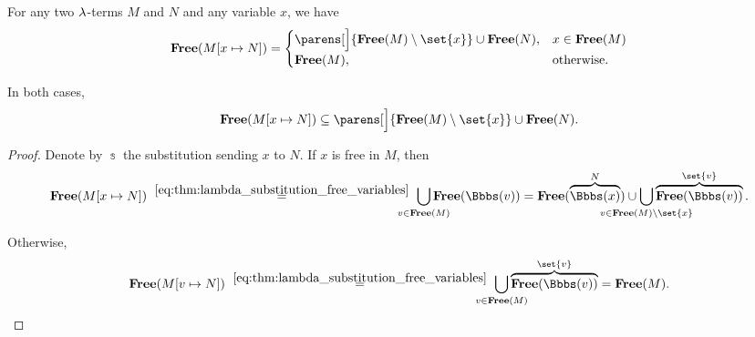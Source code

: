 \begin{corollary}\label{thm:lambda_substitution_free_variables_single}
  For any two \( \mathrm{\lambda} \)-terms \( M \) and \( N \) and any variable \( x \), we have
  \begin{equation}\label{eq:thm:lambda_substitution_free_variables_single}
    \op*{Free}( M[x \mapsto N] ) = \begin{cases}
      \parens[\Big]{ \op*{Free}(M) \setminus \set{ x } } \cup \op*{Free}(N), &x \in \op*{Free}(M) \\
      \op*{Free}(M),                                                         &\T{otherwise.}
    \end{cases}
  \end{equation}

  In both cases,
  \begin{equation}\label{eq:thm:lambda_substitution_free_variables_single/subset}
    \op*{Free}( M[x \mapsto N] ) \subseteq \parens[\Big]{ \op*{Free}(M) \setminus \set{ x } } \cup \op*{Free}(N).
  \end{equation}
\end{corollary}
\begin{proof}
  Denote by \( \Bbbs \) the substitution sending \( x \) to \( N \). If \( x \) is free in \( M \), then
  \begin{equation*}
    \op*{Free}(M[x \mapsto N])
    \reloset{\eqref{eq:thm:lambda_substitution_free_variables}} =
    \bigcup_{\mathclap{v \in \op*{Free}(M)}} \op*{Free}(\Bbbs(v))
    =
    \op*{Free}(\overbrace{\Bbbs(x)}^N) \cup \bigcup_{\mathclap{v \in \op*{Free}(M) \setminus \set{ x }}} \overbrace{\op*{Free}(\Bbbs(v))}^{\set{ v }}.
  \end{equation*}

  Otherwise,
  \begin{equation*}
    \op*{Free}(M[v \mapsto N])
    \reloset{\eqref{eq:thm:lambda_substitution_free_variables}} =
    \bigcup_{\mathclap{v \in \op*{Free}(M)}} \overbrace{\op*{Free}(\Bbbs(v))}^{\set{ v }}
    =
    \op*{Free}(M).
  \end{equation*}
\end{proof}

